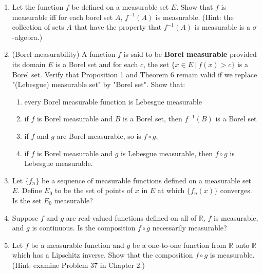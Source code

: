 \begin{enumerate}
    \item Let the function $f$ be defined on a measurable set $E$. Show that $f$ is measurable iff for each borel set $A$, $f^{-1}(A)$ is measurable. (Hint: the collection of sets $A$ that have the property that $f^{-1}(A)$ is measurable is a $\sigma$-algebra.)
    \item (Borel measurability) A function $f$ is said to be \textbf{Borel measurable} provided its domain $E$ is a Borel set and for each $c$, the set $\{x\in E\ |\ f(x)>c\}$ is a Borel set.
    Verify that Proposition 1 and Theorem 6 remain valid if we replace "(Lebesgue) measurable set" by "Borel set".
    Show that:
    \begin{enumerate}[label=(\roman*),align=left]
        \item every Borel measurable function is Lebesgue measurable
        \item if $f$ is Borel measurable and $B$ is a Borel set, then $f^{-1}(B)$ is a Borel set
        \item if $f$ and $g$ are Borel measurable, so is $f\circ g$, 
        \item if $f$ is Borel measurable and $g$ is Lebesgue measurable, then $f\circ g$ is Lebesgue measurable.
    \end{enumerate}
    \item Let $\{f_n\}$ be a sequence of measurable functions defined on a measurable set $E$.
    Define $E_0$ to be the set of points of $x$ in $E$ at which $\{f_n(x)\}$ converges. Is the set $E_0$ measurable?
    \item Suppose $f$ and $g$ are real-valued functions defined on all of $\mathbb{R}$, $f$ is measurable, and $g$ is continuous.
    Is the composition $f\circ g$ necessarily measurable?
    \item Let $f$ be a measurable function and $g$ be a one-to-one function from $\mathbb{R}$ onto $\mathbb{R}$ which has a Lipschitz inverse. Show that the composition $f\circ g$ is measurable. (Hint: examine Problem 37 in Chapter 2.)
\end{enumerate}

